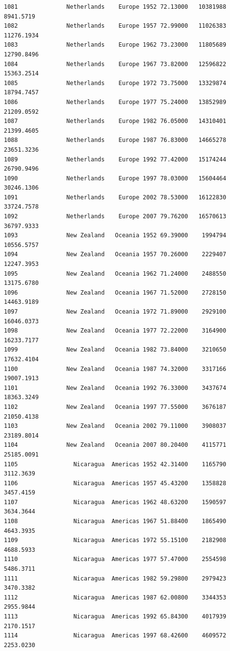 \documentclass[
  letterpaper,
  DIV=11,
  numbers=noendperiod]{scrreprt}
\begin{document}
\begin{verbatim}
1081              Netherlands    Europe 1952 72.13000   10381988   8941.5719
1082              Netherlands    Europe 1957 72.99000   11026383  11276.1934
1083              Netherlands    Europe 1962 73.23000   11805689  12790.8496
1084              Netherlands    Europe 1967 73.82000   12596822  15363.2514
1085              Netherlands    Europe 1972 73.75000   13329874  18794.7457
1086              Netherlands    Europe 1977 75.24000   13852989  21209.0592
1087              Netherlands    Europe 1982 76.05000   14310401  21399.4605
1088              Netherlands    Europe 1987 76.83000   14665278  23651.3236
1089              Netherlands    Europe 1992 77.42000   15174244  26790.9496
1090              Netherlands    Europe 1997 78.03000   15604464  30246.1306
1091              Netherlands    Europe 2002 78.53000   16122830  33724.7578
1092              Netherlands    Europe 2007 79.76200   16570613  36797.9333
1093              New Zealand   Oceania 1952 69.39000    1994794  10556.5757
1094              New Zealand   Oceania 1957 70.26000    2229407  12247.3953
1095              New Zealand   Oceania 1962 71.24000    2488550  13175.6780
1096              New Zealand   Oceania 1967 71.52000    2728150  14463.9189
1097              New Zealand   Oceania 1972 71.89000    2929100  16046.0373
1098              New Zealand   Oceania 1977 72.22000    3164900  16233.7177
1099              New Zealand   Oceania 1982 73.84000    3210650  17632.4104
1100              New Zealand   Oceania 1987 74.32000    3317166  19007.1913
1101              New Zealand   Oceania 1992 76.33000    3437674  18363.3249
1102              New Zealand   Oceania 1997 77.55000    3676187  21050.4138
1103              New Zealand   Oceania 2002 79.11000    3908037  23189.8014
1104              New Zealand   Oceania 2007 80.20400    4115771  25185.0091
1105                Nicaragua  Americas 1952 42.31400    1165790   3112.3639
1106                Nicaragua  Americas 1957 45.43200    1358828   3457.4159
1107                Nicaragua  Americas 1962 48.63200    1590597   3634.3644
1108                Nicaragua  Americas 1967 51.88400    1865490   4643.3935
1109                Nicaragua  Americas 1972 55.15100    2182908   4688.5933
1110                Nicaragua  Americas 1977 57.47000    2554598   5486.3711
1111                Nicaragua  Americas 1982 59.29800    2979423   3470.3382
1112                Nicaragua  Americas 1987 62.00800    3344353   2955.9844
1113                Nicaragua  Americas 1992 65.84300    4017939   2170.1517
1114                Nicaragua  Americas 1997 68.42600    4609572   2253.0230

\end{verbatim}
\end{document}
